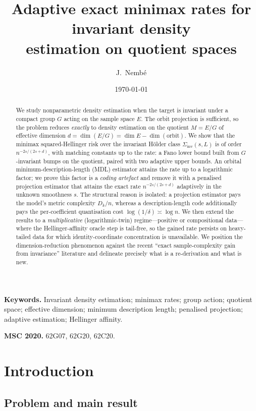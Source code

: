 \documentclass[11pt]{article}
\title{\textbf{Adaptive exact minimax rates for invariant density\\
estimation on quotient spaces}}
\author{J.~Nemb\'e}
\date{\today}
\theoremstyle{plain}
\theoremstyle{definition}
\theoremstyle{remark}
\newcommand{\Siv}{\Sigma_{\mathrm{inv}}}
\DeclareMathOperator{\dimm}{dim}
\begin{document}
\maketitle

\begin{abstract}
We study nonparametric density estimation when the target is invariant under a
compact group $G$ acting on the sample space $E$. The orbit projection is
sufficient, so the problem reduces \emph{exactly} to density estimation on the
quotient $M=E/G$ of effective dimension $d=\dimm(E/G)=\dimm E-\dimm(\text{orbit})$.
We show that the minimax squared-Hellinger risk over the invariant H\"older class
$\Siv(s,L)$ is of order $n^{-2s/(2s+d)}$, with matching constants up to the rate:
a Fano lower bound built from $G$-invariant bumps on the quotient, paired with two
adaptive upper bounds. An orbital minimum-description-length (MDL) estimator
attains the rate up to a logarithmic factor; we prove this factor is a
\emph{coding artefact} and remove it with a penalised projection estimator that
attains the exact rate $n^{-2s/(2s+d)}$ adaptively in the unknown smoothness $s$.
The structural reason is isolated: a projection estimator pays the model's metric
complexity $D_k/n$, whereas a description-length code additionally pays the
per-coefficient quantisation cost $\log(1/\delta)\asymp\log n$. We then extend the
results to a \emph{multiplicative} (logarithmic-twin) regime---positive or
compositional data---where the Hellinger-affinity oracle step is tail-free, so the
gained rate persists on heavy-tailed data for which identity-coordinate
concentration is unavailable. We position the dimension-reduction phenomenon
against the recent ``exact sample-complexity gain from invariance'' literature and
delineate precisely what is a re-derivation and what is new.
\end{abstract}

\noindent\textbf{Keywords.} Invariant density estimation; minimax rates; group
action; quotient space; effective dimension; minimum description length;
penalised projection; adaptive estimation; Hellinger affinity.

\medskip
\noindent\textbf{MSC 2020.} 62G07, 62G20, 62C20.

\tableofcontents

\section{Introduction}\label{sec:intro}

\subsection{Problem and main result}
\end{document}
